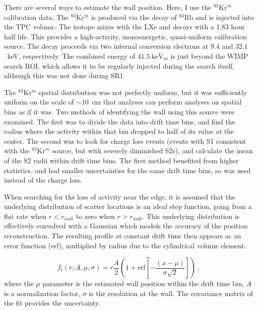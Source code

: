 There are several ways to estimate the wall position.
Here, I use the $^{83}$Kr$^m$ calibration data.
The $^{83}$Kr$^m$ is produced via the decay of $^{83}$Rb and is injected into the TPC volume.
The isotope mixes with the LXe and decays with a 1.83 hour half life\cite{kastens_calibration_2009}.
This provides a high-activity, monoenergetic, quasi-uniform calibration source.
The decay proceeds via two internal conversion electrons at $9.4$ and $32.1$~keV, respectively.
The combined energy of $41.5 \mathrm{~keV}_{\mathrm{ee}}$ is just beyond the WIMP search ROI, which allows it to be regularly injected during the search itself, although this was not done during SR1.

The $^{83}$Kr$^m$ spatial distribution was not perfectly uniform, but it was sufficiently uniform on the scale of $\sim 10$~cm that analyses can perform analyses on spatial bins as if it was.
Two methods of identifying the wall using this source were examined. 
The first was to divide the data into drift time bins, and find the radius where the activity within that bin dropped to half of its value at the center.
The second was to look for charge loss events (events with S1 consistent with the $^{83}$Kr$^m$ source, but with severely diminished S2s), and calculate the mean of the S2 radii within drift time bins.
The first method benefited from higher statistics, and had smaller uncertainties for the same drift time bins, so was used instead of the charge loss.

When searching for the loss of activity near the edge, it is assumed that the underlying distribution of scatter locations is an ideal step function, going from a flat rate when $r<r_{wall}$ to zero when $r> r_{wall}$.
This underlying distribution is effectively convolved with a Gaussian which models the accuracy of the position reconstruction.
The resulting profile at constant drift time then appears as an error function (erf), multiplied by radius due to the cylindrical volume element:

\begin{equation}
    f_t(r;A, \mu, \sigma) = r\frac{A}{2}(1+\text{erf}[-\frac{(x-\mu)}{\sigma \sqrt{2}}])~,
\end{equation}
\noindent
where the $\mu$ parameter is the estimated wall position within the drift time bin, $A$ is a normalization factor, $\sigma$ is the resolution at the wall.
The covariance matrix of the fit provides the uncertainty.

